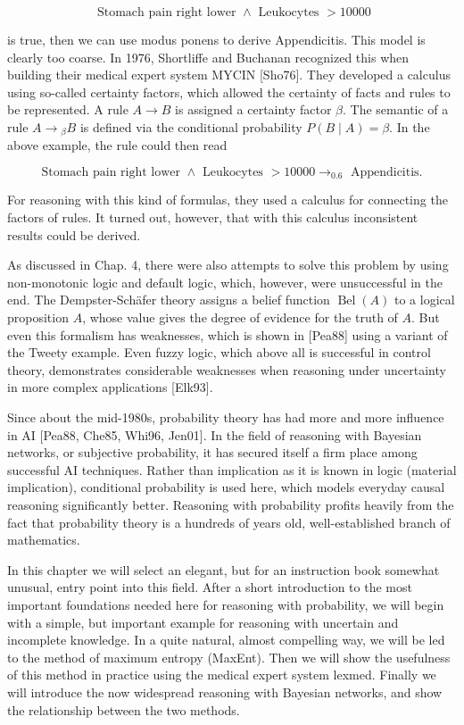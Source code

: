 \documentclass[10pt]{book}
\begin{document}
\begin{center}
\begin{enumerate}
$$
\text { Stomach pain right lower } \wedge \text { Leukocytes }>10000
$$

is true, then we can use modus ponens to derive Appendicitis. This model is clearly too coarse. In 1976, Shortliffe and Buchanan recognized this when building their medical expert system MYCIN [Sho76]. They developed a calculus using so-called certainty factors, which allowed the certainty of facts and rules to be represented. A rule $A \rightarrow B$ is assigned a certainty factor $\beta$. The semantic of a rule $A \rightarrow{ }_{\beta} B$ is defined via the conditional probability $P(B \mid A)=\beta$. In the above example, the rule could then read

$$
\text { Stomach pain right lower } \wedge \text { Leukocytes }>10000 \rightarrow_{0.6} \text { Appendicitis. }
$$

For reasoning with this kind of formulas, they used a calculus for connecting the factors of rules. It turned out, however, that with this calculus inconsistent results could be derived.

As discussed in Chap. 4, there were also attempts to solve this problem by using non-monotonic logic and default logic, which, however, were unsuccessful in the end. The Dempster-Schäfer theory assigns a belief function $\operatorname{Bel}(A)$ to a logical proposition $A$, whose value gives the degree of evidence for the truth of $A$. But even this formalism has weaknesses, which is shown in [Pea88] using a variant of the Tweety example. Even fuzzy logic, which above all is successful in control theory, demonstrates considerable weaknesses when reasoning under uncertainty in more complex applications [Elk93].


Since about the mid-1980s, probability theory has had more and more influence in AI [Pea88, Che85, Whi96, Jen01]. In the field of reasoning with Bayesian networks, or subjective probability, it has secured itself a firm place among successful AI techniques. Rather than implication as it is known in logic (material implication), conditional probability is used here, which models everyday causal reasoning significantly better. Reasoning with probability profits heavily from the fact that probability theory is a hundreds of years old, well-established branch of mathematics.

In this chapter we will select an elegant, but for an instruction book somewhat unusual, entry point into this field. After a short introduction to the most important foundations needed here for reasoning with probability, we will begin with a simple, but important example for reasoning with uncertain and incomplete knowledge. In a quite natural, almost compelling way, we will be led to the method of maximum entropy (MaxEnt). Then we will show the usefulness of this method in practice using the medical expert system lexmed. Finally we will introduce the now widespread reasoning with Bayesian networks, and show the relationship between the two methods.


\end{enumerate}
\end{center}
\end{document}
